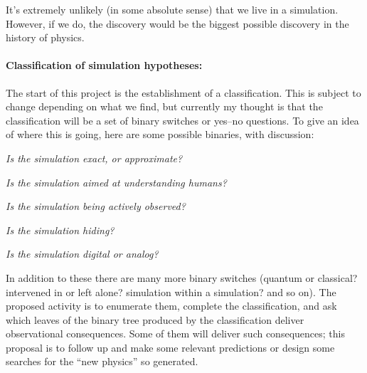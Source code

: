 \documentclass[12pt]{article}
\begin{document}
It's extremely unlikely (in some absolute sense) that we live in a simulation.
However, if we do, the discovery would be the biggest possible discovery in the history of physics.

\paragraph{Classification of simulation hypotheses:}
The start of this project is the establishment of a classification.
This is subject to change depending on what we find, but currently my thought is that the classification will be a set of binary switches or yes--no questions.
To give an idea of where this is going, here are some possible binaries, with discussion:

\textsl{Is the simulation exact, or approximate?}

\textsl{Is the simulation aimed at understanding humans?}

\textsl{Is the simulation being actively observed?}

\textsl{Is the simulation hiding?}

\textsl{Is the simulation digital or analog?}

In addition to these there are many more binary switches (quantum or classical? intervened in or left alone? simulation within a simulation? and so on).
The proposed activity is to enumerate them, complete the classification, and ask which leaves of the binary tree produced by the classification deliver observational consequences.
Some of them will deliver such consequences; this proposal is to follow up and make some relevant predictions or design some searches for the ``new physics'' so generated.
\end{document}
